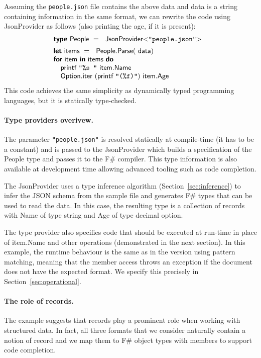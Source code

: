 \documentclass[10pt]{sigplanconf}
\newcommand{\kvd}[1]{\textbf{\sffamily #1}}
\newcommand{\ident}[1]{\textnormal{\sffamily #1}}
\newcommand{\str}[1]{\texttt{#1}}
\newcommand{\rangl}{\hspace{-0.3em}>\hspace{-0.25em}}
\newcommand{\langl}{\hspace{-0.25em}<\hspace{-0.3em}}
\begin{document}
Assuming the \str{people.json} file contains the above data and \ident{data} is a string 
containing information in the same format, we can rewrite the code using \ident{JsonProvider} as 
follows (also printing the age, if it is present):
%
\begin{equation*}
\begin{array}{l}
\kvd{type}~\ident{People}~=~\ident{JsonProvider}\langl\str{"people.json"}\rangl\hspace{1em} \\[0.5em]
\kvd{let}~\ident{items}~=~\ident{People.Parse}(\ident{data})\\
\kvd{for}~\ident{item}~\kvd{in}~\ident{items}~\kvd{do}\\
\quad\ident{printf}~\str{"\%s "}~\ident{item.Name}\\
\quad\ident{Option.iter}~(\ident{printf}~\str{"(\%f)"})~\ident{item.Age}
\end{array}
\end{equation*}
%
This code achieves the same simplicity as dynamically typed programming languages, but it 
is statically type-checked.
%
\paragraph{Type providers overivew.}
The parameter \str{"people.json"} is resolved 
statically at compile-time (it has to be a constant) and is passed to the 
\ident{JsonProvider} which builds a specification of the \ident{People} type and passes it
to the F\# compiler. This type information is also available at development time allowing
advanced tooling such as code completion.

The \ident{JsonProvider} uses a type inference algorithm
(Section~\ref{sec:inference}) to infer the JSON schema from the sample file and generates
F\# types that can be used to read the data. In this case, the resulting type is a collection
of records with \ident{Name} of type \ident{string} and \ident{Age} of type \ident{decimal option}.

The type provider also specifies code that should be executed
at run-time in place of \ident{item.Name} and other operations (demonstrated in the next section).
In this example, the runtime behaviour is the same as in the version using pattern matching,
meaning that the member access throws an exception if the document does not have the expected
format. We specify this precisely in Section~\ref{sec:operational}.

\paragraph{The role of records.}
The example suggests that records play a prominent role when working with structured data. 
In fact, all three formats that we consider naturally contain a notion of record and we map 
them to F\# object types with members to support code completion.
\end{document}
